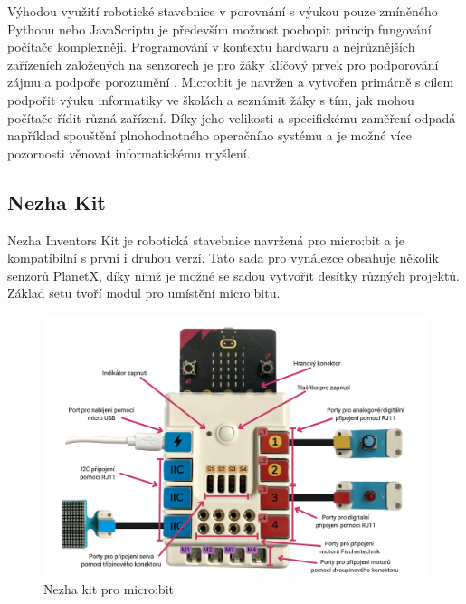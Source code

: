 \documentclass[
  digital,     %
  oneside,     %
  nosansbold,  %
  colorbold, %
  lof,         %
  nolot,         %
]{fithesis4}
\begin{document}
Výhodou využití robotické stavebnice v porovnání s výukou pouze zmíněného Pythonu nebo JavaScriptu je především možnost pochopit princip fungování počítače komplexněji. Programování v kontextu hardwaru a nejrůznějších zařízeních založených na senzorech je pro žáky klíčový prvek pro podporování zájmu a podpoře porozumění  \cite{Sentance17}. Micro:bit je navržen a vytvořen primárně s cílem podpořit výuku informatiky ve školách a seznámit žáky s tím, jak mohou počítače řídit různá zařízení. Díky jeho velikosti a specifickému zaměření odpadá například spouštění plnohodnotného operačního systému a je možné více pozornosti věnovat informatickému myšlení.

\subsection{Nezha Kit}
Nezha Inventors Kit je robotická stavebnice navržená pro micro:bit a je kompatibilní s první i druhou verzí. Tato sada pro vynálezce obsahuje několik senzorů PlanetX, díky nimž je možné se sadou vytvořit desítky různých projektů. Základ setu tvoří modul pro umístění micro:bitu. 

\begin{figure}
    \centering
    \includegraphics[width=\textwidth] {images/nezha.png}
    \caption{Nezha kit pro micro:bit}
    \label{nezha}
\end{figure}
\end{document}
